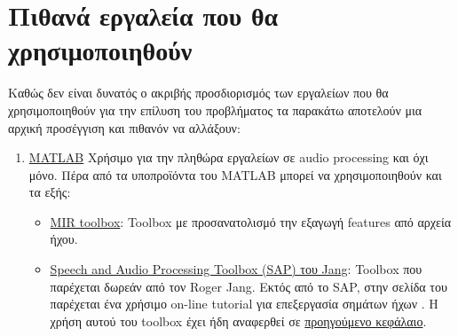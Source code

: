 \section{Πιθανά εργαλεία που θα χρησιμοποιηθούν}
Καθώς δεν είναι δυνατός ο ακριβής προσδιορισμός των εργαλείων που θα χρησιμοποιηθούν για την επίλυση του προβλήματος τα παρακάτω αποτελούν μια αρχική προσέγγιση και πιθανόν να αλλάξουν:
\begin{enumerate}
	\item \href{https://www.mathworks.com/products/matlab/}{MATLAB}
	      Χρήσιμο για την πληθώρα εργαλείων σε audio processing και όχι μόνο.
	      Πέρα από τα υποπροϊόντα του MATLAB μπορεί να χρησιμοποιηθούν και τα εξής:
	      \begin{itemize}
	      	\item \href{https://www.jyu.fi/hum/laitokset/musiikki/en/research/coe/materials/mirtoolbox}{MIR toolbox}:
	      	      Toolbox με προσανατολισμό την εξαγωγή features από αρχεία ήχου.
	      	\item \href{http://mirlab.org/jang/matlab/toolbox/sap/}{Speech and Audio Processing Toolbox (SAP) του Jang}:
	      	      Toolbox που παρέχεται δωρεάν από τον Roger Jang.
	      	      Εκτός από το SAP, στην σελίδα του παρέχεται ένα χρήσιμο on-line tutorial για επεξεργασία σημάτων ήχων \cite{jang2011audio}.
	      	      Η χρήση αυτού του toolbox έχει ήδη αναφερθεί σε \hyperref[pve:SAP]{προηγούμενο κεφάλαιο}.
	      \end{itemize}


\end{enumerate}
